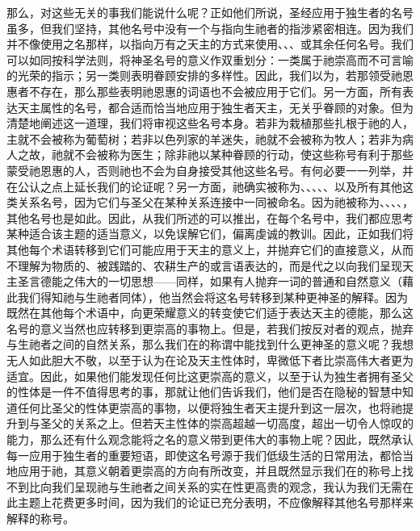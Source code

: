 那么，对这些无关的事我们能说什么呢？正如他们所说，圣经应用于独生者的名号虽多，但我们坚持，其他名号中没有一个与指向生祂者的指涉紧密相连。因为我们并不像使用之名那样，以指向万有之天主的方式来使用、、、或其余任何名号。我们可以如同按科学法则，将神圣名号的意义作双重划分：一类属于祂崇高而不可言喻的光荣的指示；另一类则表明眷顾安排的多样性。因此，我们以为，若那领受祂恩惠者不存在，那么那些表明祂恩惠的词语也不会被应用于它们。另一方面，所有表达天主属性的名号，都合适而恰当地应用于独生者天主，无关乎眷顾的对象。但为清楚地阐述这一道理，我们将审视这些名号本身。若非为栽植那些扎根于祂的人，主就不会被称为葡萄树；若非以色列家的羊迷失，祂就不会被称为牧人；若非为病人之故，祂就不会被称为医生；除非祂以某种眷顾的行动，使这些称号有利于那些蒙受祂恩惠的人，否则祂也不会为自身接受其他这些名号。有何必要一一列举，并在公认之点上延长我们的论证呢？另一方面，祂确实被称为、、、、、以及所有其他这类关系名号，因为它们与圣父在某种关系连接中一同被命名。因为祂被称为、、、、，其他名号也是如此。因此，从我们所述的可以推出，在每个名号中，我们都应思考某种适合该主题的适当意义，以免误解它们，偏离虔诚的教训。因此，正如我们将其他每个术语转移到它们可能应用于天主的意义上，并抛弃它们的直接意义，从而不理解为物质的、被践踏的、农耕生产的或言语表达的，而是代之以向我们呈现天主圣言德能之伟大的一切思想——同样，如果有人抛弃一词的普通和自然意义（藉此我们得知祂与生祂者同体），他当然会将这名号转移到某种更神圣的解释。因为既然在其他每个术语中，向更荣耀意义的转变使它们适于表达天主的德能，那么这名号的意义当然也应转移到更崇高的事物上。但是，若我们按反对者的观点，抛弃与生祂者之间的自然关系，那么我们在的称谓中能找到什么更神圣的意义呢？我想无人如此胆大不敬，以至于认为在论及天主性体时，卑微低下者比崇高伟大者更为适宜。因此，如果他们能发现任何比这更崇高的意义，以至于认为独生者拥有圣父的性体是一件不值得思考的事，那就让他们告诉我们，他们是否在隐秘的智慧中知道任何比圣父的性体更崇高的事物，以便将独生者天主提升到这一层次，也将祂提升到与圣父的关系之上。但若天主性体的崇高超越一切高度，超出一切令人惊叹的能力，那么还有什么观念能将之名的意义带到更伟大的事物上呢？因此，既然承认每一应用于独生者的重要短语，即使这名号源于我们低级生活的日常用法，都恰当地应用于祂，其意义朝着更崇高的方向有所改变，并且既然显示我们在的称号上找不到比向我们呈现祂与生祂者之间关系的实在性更高贵的观念，我认为我们无需在此主题上花费更多时间，因为我们的论证已充分表明，不应像解释其他名号那样来解释的称号。\par

